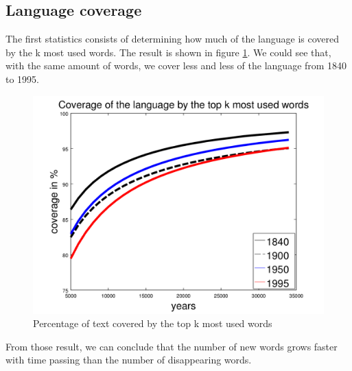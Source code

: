 \subsection{Language coverage}

The first statistics consists of determining how much of the language is covered by the k most used words. The result is shown in figure \ref{coverage_figure}. We could see that, with the same amount of words, we cover less and less of the language from 1840 to 1995.

\begin{figure}[H]
	\centering
    \includegraphics[scale=0.50]{Pictures/statistics/top-k-words-coverage/coverage.png}
    \caption{Percentage of text covered by the top k most used words}
    \label{coverage_figure}
\end{figure}

From those result, we can conclude that the number of new words grows faster with time passing than the number of disappearing words.

